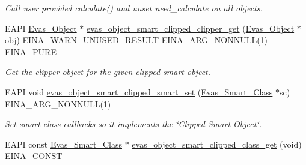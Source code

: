 \begin{DoxyCompactItemize}
\begin{DoxyCompactList}\small\item\em Call user provided calculate() and unset need\_\-calculate on all objects. \item\end{DoxyCompactList}\item 
EAPI \hyperlink{group__Evas__Object__Group_ga9e19e6dd1f517a0ba437c0114d3e7c97}{Evas\_\-Object} $\ast$ \hyperlink{group__Evas__Smart__Object__Clipped_ga27b74fdbecd5d915c9ec832199048907}{evas\_\-object\_\-smart\_\-clipped\_\-clipper\_\-get} (\hyperlink{group__Evas__Object__Group_ga9e19e6dd1f517a0ba437c0114d3e7c97}{Evas\_\-Object} $\ast$obj) EINA\_\-WARN\_\-UNUSED\_\-RESULT EINA\_\-ARG\_\-NONNULL(1) EINA\_\-PURE
\begin{DoxyCompactList}\small\item\em Get the clipper object for the given clipped smart object. \item\end{DoxyCompactList}\item 
EAPI void \hyperlink{group__Evas__Smart__Object__Clipped_ga3725ce3a781c93120637ad6a58f6e628}{evas\_\-object\_\-smart\_\-clipped\_\-smart\_\-set} (\hyperlink{struct__Evas__Smart__Class}{Evas\_\-Smart\_\-Class} $\ast$sc) EINA\_\-ARG\_\-NONNULL(1)
\begin{DoxyCompactList}\small\item\em Set smart class callbacks so it implements the \char`\"{}Clipped Smart Object\char`\"{}. \item\end{DoxyCompactList}\item 
EAPI const \hyperlink{struct__Evas__Smart__Class}{Evas\_\-Smart\_\-Class} $\ast$ \hyperlink{group__Evas__Smart__Object__Clipped_ga83e064112f527be0c2156c425562a57c}{evas\_\-object\_\-smart\_\-clipped\_\-class\_\-get} (void) EINA\_\-CONST\label{group__Evas__Smart__Object__Clipped_ga83e064112f527be0c2156c425562a57c}


\end{DoxyCompactItemize}
